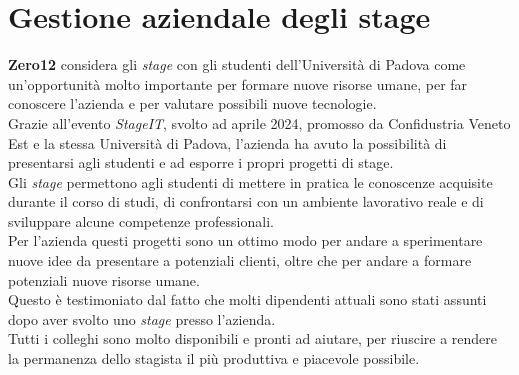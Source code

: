 \section{Gestione aziendale degli stage}
\label{sez:gestione-aziendale-stage}

\textbf{Zero12} considera gli \textit{stage} con gli studenti dell'Università di Padova come un'opportunità molto importante per formare nuove risorse umane, 
per far conoscere l'azienda e per valutare possibili nuove tecnologie.\\
Grazie all'evento \textit{StageIT}, svolto ad aprile 2024, promosso da Confidustria Veneto Est e la stessa Università di Padova,
l'azienda ha avuto la possibilità di presentarsi agli studenti e ad esporre i propri progetti di stage.\\

\noindent Gli \textit{stage} permettono agli studenti di mettere in pratica le conoscenze acquisite durante il corso di studi, di confrontarsi con un ambiente lavorativo reale e di
sviluppare alcune competenze professionali.\\
Per l'azienda questi progetti sono un ottimo modo per andare a sperimentare nuove idee da presentare a potenziali clienti, oltre che per andare
a formare potenziali nuove risorse umane.\\
Questo è testimoniato dal fatto che molti dipendenti attuali sono stati assunti dopo aver svolto uno \textit{stage} presso l'azienda.\\
Tutti i colleghi sono molto disponibili e pronti ad aiutare, per riuscire a rendere la permanenza dello stagista il più produttiva e piacevole possibile.\\